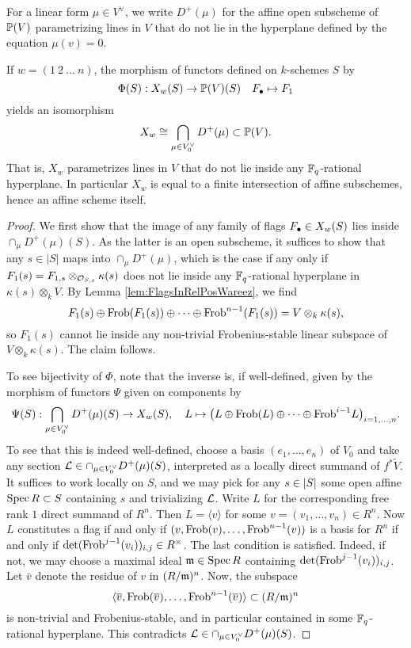 \documentclass[../main.tex]{subfiles}
\begin{document}
For a linear form $\mu \in V^\vee$, we write 
$D^+(\mu)$ for the affine open subscheme of $\mathbb{P}(V)$ parametrizing
lines in $V$ that do not lie in the hyperplane defined by the equation $\mu(v) = 0$.

\begin{prop}\label{prop:XwExplicitely}
  If $w = (1 \ 2 \ \dots \ n)$, the morphism of functors defined on 
  $k$-schemes $S$ by
  \begin{equation*}
    \Phi(S): X_w(S) \to \mathbb{P}(V)(S) \quad F_\bullet \mapsto F_1
  \end{equation*}
  yields an isomorphism 
  $$X_w \cong \bigcap_{\mu \in V_0^\vee} D^+(\mu) \subset \mathbb{P}(V).$$
  That is, $X_w$ parametrizes lines in $V$ that do not lie inside any
  $\mathbb{F}_q$-rational hyperplane. In particular $X_w$ is equal to a finite
  intersection of affine subschemes, hence an affine scheme itself.
\begin{proof}
  We first show that the image of any family of flags $F_\bullet \in X_w(S)$ lies inside
  $\cap_{\mu} D^+(\mu)(S)$. As the latter is an open subscheme, it suffices to
  show that any $s \in |S|$ maps into
  $\cap_{\mu} D^+(\mu)$, which is the case if any only if $F_1(s) = F_{1,s}
  \otimes_{\mathcal{O}_{S,s}} \kappa(s)$  does not lie inside
  any $\mathbb{F}_q$-rational hyperplane in $\kappa(s) \otimes_k V$. By Lemma
  \ref{lem:FlagsInRelPosWareez}, we find
  $$F_1(s) \oplus \mathrm{Frob}(F_1(s)) \oplus \dots \oplus \mathrm{Frob}^{n-1}(F_1(s)) = V
  \otimes_k \kappa(s),$$
  so $F_1(s)$ cannot lie inside any non-trivial Frobenius-stable linear subspace
  of $V \otimes_k \kappa(s)$. The claim follows. 

  To see bijectivity of $\Phi$, note that the inverse is, if well-defined,
  given by the morphism of functors $\Psi$ given on components by 
  \begin{equation*}
    \Psi(S): \bigcap_{\mu \in V_0^\vee}D^+(\mu)(S) \to X_w(S), \quad L \mapsto 
    \big(L \oplus \mathrm{Frob}(L) \oplus \dots \oplus \mathrm{Frob}^{i-1} L\big)_{i = 1, \dots, n}.
  \end{equation*}
  To see that this is indeed well-defined, choose a basis $(e_1, \dots, e_n)$
  of $V_0$ and take any section $\mathcal{L} \in \cap_{\mu \in
  V_0^\vee}D^+(\mu)(S)$, interpreted as a locally direct summand of $f^* \tilde V$. 
  It suffices to work locally on $S$, and we may pick for any $s \in \lvert S \rvert$
  some open affine $\operatorname{Spec} R \subset S$ containing $s$ and trivializing $\mathcal{L}$.
  Write $L$ for the corresponding free rank $1$ direct summand of $R^n$. Then
  $L = \langle v \rangle$ for some $v = (v_1, \dots, v_n) \in R^n$. Now 
  $L$ constitutes a flag if and only if $(v, \mathrm{Frob}(v), \dots, \mathrm{Frob}^{n-1}(v))$
  is a basis for $R^n$ if and only if $\det(\mathrm{Frob}^{j-1}(v_i))_{i,j} \in R^\times$.
  The last condition is satisfied. Indeed, if not, we may 
  choose a maximal ideal $\mathfrak{m} \in \operatorname{Spec} R$ containing
  $\det(\mathrm{Frob}^{j-1}(v_i))_{i,j}$. Let $\bar v$ denote the residue of $v$ in
  $(R/\mathfrak{m})^n$. Now, the subspace
  $$\langle \overline v, \mathrm{Frob}(\overline v), \dots, \mathrm{Frob}^{n-1}(\overline v)\rangle \subset (R/\mathfrak{m})^n$$ 
  is non-trivial and Frobenius-stable, and in particular
  contained in some $\mathbb{F}_q$-rational hyperplane. This contradicts $\mathcal{L} \in
  \cap_{\mu \in V_0^\vee}D^+(\mu)(S)$. 
\end{proof}
\end{prop}
\end{document}
